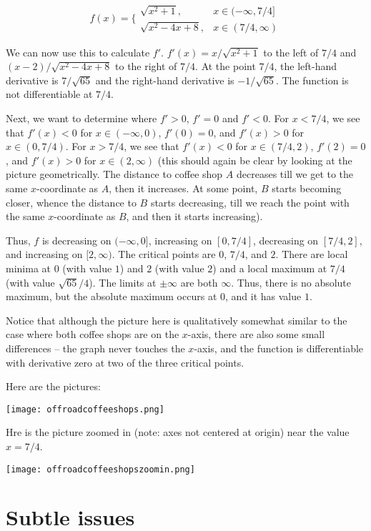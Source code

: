 \documentclass[10pt]{amsart}
\begin{document}
$$f(x) = \lbrace \begin{array}{rl} \sqrt{x^2 + 1}, & x \in (-\infty,7/4]\\ \sqrt{x^2 - 4x + 8}, & x \in (7/4,\infty)\end{array}$$

We can now use this to calculate $f'$. $f'(x) = x/\sqrt{x^2 + 1}$ to
the left of $7/4$ and $(x - 2)/\sqrt{x^2 - 4x + 8}$ to the right of
$7/4$. At the point $7/4$, the left-hand derivative is $7/\sqrt{65}$
and the right-hand derivative is $-1/\sqrt{65}$. The function is not
differentiable at $7/4$.

Next, we want to determine where $f' > 0$, $f' = 0$ and $f' < 0$. For
$x < 7/4$, we see that $f'(x) < 0$ for $x \in (-\infty,0)$, $f'(0) =
0$, and $f'(x) > 0$ for $x \in (0,7/4)$. For $x > 7/4$, we see that
$f'(x) < 0$ for $x \in (7/4,2)$, $f'(2) = 0$, and $f'(x) > 0$ for $x
\in (2,\infty)$ (this should again be clear by looking at the picture
geometrically. The distance to coffee shop $A$ decreases till we get
to the same $x$-coordinate as $A$, then it increases. At some point,
$B$ starts becoming closer, whence the distance to $B$ starts
decreasing, till we reach the point with the same $x$-coordinate as
$B$, and then it starts increasing).

Thus, $f$ is decreasing on $(-\infty,0]$, increasing on $[0,7/4]$,
decreasing on $[7/4,2]$, and increasing on $[2,\infty)$. The critical
points are $0$, $7/4$, and $2$. There are local minima at $0$ (with
value $1$) and $2$ (with value $2$) and a local maximum at $7/4$ (with
value $\sqrt{65}/4$). The limits at $\pm \infty$ are both
$\infty$. Thus, there is no absolute maximum, but the absolute maximum
occurs at $0$, and it has value $1$.

Notice that although the picture here is qualitatively somewhat
similar to the case where both coffee shops are on the $x$-axis, there
are also some small differences -- the graph never touches the
$x$-axis, and the function is differentiable with derivative zero at
two of the three critical points.

Here are the pictures:

\texttt{[image: offroadcoffeeshops.png]}

Hre is the picture zoomed in (note: axes not centered at origin) near
the value $x = 7/4$.

\texttt{[image: offroadcoffeeshopszoomin.png]}

\section{Subtle issues}
\end{document}
